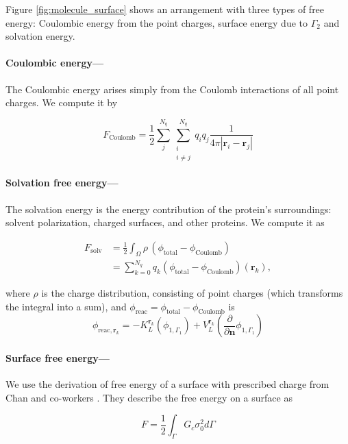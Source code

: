
Figure \ref{fig:molecule_surface} shows an arrangement with three types of free energy: Coulombic energy from the point charges, surface energy due to $\Gamma_2$ and solvation energy. 

\medskip

\paragraph*{Coulombic energy---}

The Coulombic energy arises simply from the Coulomb interactions of all point charges. We compute it by

\begin{equation} \label{eq:coul_energy}
F_\text{Coulomb} = \frac{1}{2} \sum_j^{N_q}\sum^{N_q}_{\substack{i\\ i\neq j}} q_iq_j\frac{1}{4\pi |\mathbf{r}_i-\mathbf{r}_j|}
\end{equation}

\paragraph*{Solvation free energy---}

The solvation energy is the energy contribution of the protein's surroundings: solvent polarization, charged surfaces, and other proteins. We compute it as

\begin{align} \label{eq:solv_energy}
F_{\text{solv}} &= \frac{1}{2} \int_{\Omega} \rho \,(\phi_{\text{total}} - \phi_{\text{Coulomb}}) \\
&= \sum_{k=0}^{N_q} q_k (\phi_{\text{total}} - \phi_{\text{Coulomb}})(\mathbf{r}_k),
\end{align}

\noindent where $\rho$ is the charge distribution, consisting of point charges (which transforms the integral into a sum), and $\phi_\text{reac} = \phi_{\text{total}} - \phi_{\text{Coulomb}}$ is
%
\begin{equation} \label{eq:phi_reac_bem}
\phi_{\text{reac},\mathbf{r}_k} = -K_{L}^{\mathbf{r}_k}(\phi_{1,\Gamma_1}) + V_{L}^{\mathbf{r}_k} \left(\frac{\partial}{\partial \mathbf{n}}\phi_{1,\Gamma_1} \right) 
\end{equation}

\paragraph*{Surface free energy---}

We use the derivation of free energy of a surface with prescribed charge from Chan and co-workers \cite{ChanMitchell1983,CarnieChan1993}. They describe the free energy on a surface as

\begin{equation} \label{eq:energy_surf}
F = \frac{1}{2} \int_{\Gamma} G_c \sigma_0^2 d\Gamma 
\end{equation} 
